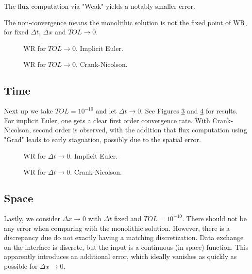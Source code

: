 \documentclass[a4paper,10pt]{article}
\begin{document}
The flux computation via "Weak" yields a notably smaller error.

The non-convergence means the monolithic solution is not the fixed point of WR, for fixed $\Delta t$, $\Delta x$ and $TOL \rightarrow 0$.

\begin{figure}[ht!]
\caption{WR for $TOL \rightarrow 0$. Implicit Euler.}
\label{FIG WR TOL 1}
\end{figure}

\begin{figure}[ht!]
\caption{WR for $TOL \rightarrow 0$. Crank-Nicolson.}
\label{FIG WR TOL 2}
\end{figure}
% 
\FloatBarrier
\subsection{Time}
Next up we take $TOL = 10^{-10}$ and let $\Delta t \rightarrow 0$. See Figures \ref{FIG WR DT 1} and \ref{FIG WR DT 2} for results. For implicit Euler, one gets a clear first order convergence rate. With Crank-Nicolson, second order is observed, with the addition that flux computation using "Grad" leads to early stagnation, possibly due to the spatial error.

\begin{figure}[ht!]
\caption{WR for $\Delta t \rightarrow 0$. Implicit Euler.}
\label{FIG WR DT 1}
\end{figure}
% 
\begin{figure}[ht!]
\caption{WR for $\Delta t \rightarrow 0$. Crank-Nicolson.}
\label{FIG WR DT 2}
\end{figure}
% 
\FloatBarrier
\subsection{Space}
Lastly, we consider $\Delta x \rightarrow 0$ with $\Delta t$ fixed and $TOL = 10^{-10}$. There should not be any error when comparing with the monolithic solution. However, there is a discrepancy due do not exactly having a matching discretization. Data exchange on the interface is discrete, but the input is a continuous (in space) function. This apparently introduces an additional error, which ideally vanishes as quickly as possible for $\Delta x \rightarrow 0$.
\end{document}
